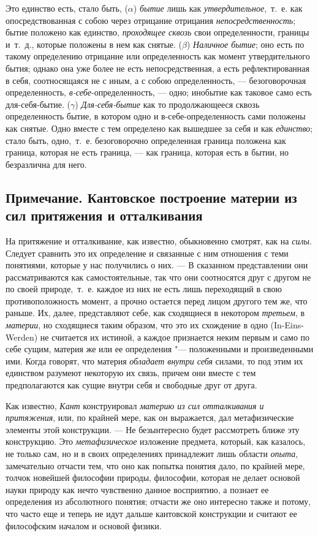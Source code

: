 Это единство есть, стало быть, ($\alpha $) {\em бытие}
лишь как {\em утвердительное},~т.~е. как
опосредствованная с собою через отрицание отрицания
{\em непосредственность}; бытие положено как единство,
{\em проходящее сквозь} свои определенности, границы
и~т.~д., которые положены в нем как снятые. ($\beta $)
{\em Наличное бытие}; оно есть по такому определению
отрицание или определенность как момент утвердительного бытия; однако она
уже более не есть непосредственная, а есть рефлектированная в себя,
соотносящаяся не с иным, а с собою определенность, — безоговорочная
определенность, {\em в-себе}{}-определенность, — одно;
инобытие как таковое само есть для-себя-бытие. ($\gamma $)
{\em Для-себя-бытие} как то продолжающееся сквозь
определенность бытие, в котором одно и в-себе-определенность сами положены
как снятые. Одно вместе с тем определено как вышедшее за себя и как
{\em единство}; стало быть, одно,~т.~е. безоговорочно
определенная граница положена как граница, которая не есть граница, — как
граница, которая есть в бытии, но безразлична для него.

\subsection*{Примечание. Кантовское построение материи из
сил притяжения и отталкивания}

На притяжение и отталкивание, как известно, обыкновенно смотрят, как на
{\em силы}. Следует сравнить это их определение и
связанные с ним отношения с теми понятиями, которые у нас получились о них.
— В сказанном представлении они рассматриваются как самостоятельные, так
что они соотносятся друг с другом не по своей природе,~т.~е. каждое из них
не есть лишь переходящий в свою противоположность момент, а прочно остается
перед лицом другого тем же, что раньше. Их, далее, представляют себе, как
сходящиеся в некотором {\em третьем}, в
{\em материи}, но сходящиеся таким образом, что это их
схождение в одно (In-Eins-Werden) не считается их истиной, а каждое
признается неким первым и само по себе сущим, материя же или ее
определения "--- положенными и произведенными ими. Когда говорят, что материя
{\em обладает внутри себя} силами, то под этим их
единством разумеют некоторую их связь, причем они вместе с тем
предполагаются как сущие внутри себя и свободные друг от друга.

Как известно, {\em Кант} конструировал
{\em материю из сил отталкивания и притяжения}, или, по
крайней мере, как он выражается, дал метафизические элементы этой
конструкции. — Не безынтересно будет рассмотреть ближе эту конструкцию. Это
{\em метафизическое} изложение предмета, который, как
казалось, не только сам, но и в своих определениях принадлежит лишь области
{\em опыта}, замечательно отчасти тем, что оно как
попытка понятия дало, по крайней мере, толчок новейшей философии природы,
философии, которая не делает основой науки природу как нечто чувственно
данное восприятию, а познает ее определения из абсолютного понятия; отчасти
же оно интересно также и потому, что часто еще и теперь не идут дальше
кантовской конструкции и считают ее философским началом и основой физики.

